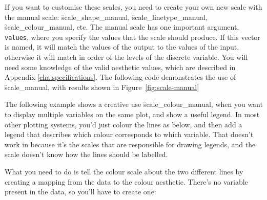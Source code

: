 If you want to customise these scales, you need to create your own new scale with the manual scale: \f{scale_shape_manual}, \f{scale_linetype_manual}, \f{scale_colour_manual}, etc. The manual scale has one important argument, \verb|values|, where you specify the values that the scale should produce. If this vector is named, it will match the values of the output to the values of the input, otherwise it will match in order of the levels of the discrete variable. You will need some knowledge of the valid aesthetic values, which are described in Appendix \ref{cha:specifications}.  The following code demonstrates the use of \f{scale_manual}, with results shown in Figure~\ref{fig:scale-manual}

% 


The following example shows a creative use \f{scale_colour_manual}, when you want to display multiple variables on the same plot, and show a useful legend. In most other plotting systems, you'd just colour the lines as below, and then add a legend that describes which colour corresponds to which variable.  That doesn't work in \ggplot because it's the scales that are responsible for drawing legends, and the scale doesn't know how the lines should be labelled.

% 


What you need to do is tell the colour scale about the two different lines by creating a mapping from the data to the colour aesthetic. There's no variable present in the data, so you'll have to create one:

% 


